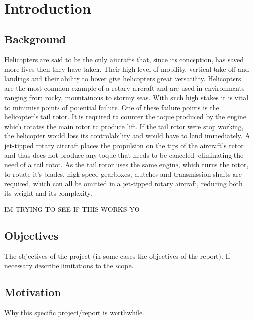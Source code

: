 \chapter{Introduction}

\section{Background}

Helicopters are said to be the only aircrafts that, since its conception, has saved more lives then they have taken. Their  high level of mobility, vertical take off and landings and their ability to hover give helicopters great versatility. Helicopters are the most common example of a rotary aircraft and are used in environments ranging from rocky, mountainous to stormy seas. With such high stakes it is vital to minimise points of potential failure. One of these failure points is the helicopter's tail rotor. It is required to counter the toque produced by the engine which rotates the main rotor to produce lift. If the tail rotor were stop working, the helicopter would lose its controlability and would have to land immediately. A jet-tipped rotary aircraft places the propulsion on the tips of the aircraft's rotor and thus does not produce any toque that needs to be canceled, eliminating the need of a tail rotor. As the tail rotor uses the same engine, which turns the rotor, to rotate it's blades, high speed gearboxes, clutches and transmission shafts are required, which can all be omitted in a jet-tipped rotary aircraft, reducing both its weight and its complexity.

IM TRYING TO SEE IF THIS WORKS YO

\section{Objectives}

The objectives of the project (in some cases the objectives of the report). If necessary describe limitations to the scope.

\section{Motivation}

Why this specific project/report is worthwhile.